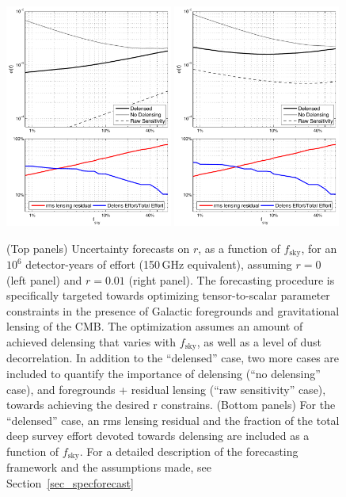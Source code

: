 \begin{figure}[!h]
\centering
\includegraphics[width=0.49\textwidth]{Inflation/sigr_fsky_det1e6_r0.pdf}
\includegraphics[width=0.49\textwidth]{Inflation/sigr_fsky_det1e6_r01.pdf}
\caption{(Top panels)
Uncertainty forecasts on $r$, as a function of $f_\mathrm{sky}$, for an
$10^6$ detector-years of effort (150\,GHz equivalent), assuming $r=0$ (left panel) 
and $r=0.01$ (right panel). The forecasting procedure is specifically targeted 
towards optimizing tensor-to-scalar parameter constraints in the presence of 
Galactic foregrounds and gravitational lensing of the CMB. The optimization 
assumes an amount of achieved delensing that varies with $f_\mathrm{sky}$, as well as a
level of dust decorrelation. In addition to the ``delensed'' case, two more cases are
 included to quantify the importance of delensing (``no delensing'' case), and 
foregrounds + residual lensing (``raw sensitivity'' case), towards achieving the 
desired r constrains.
(Bottom panels)
For the ``delensed'' case, an rms lensing residual and the fraction of the total 
deep survey effort devoted towards delensing are included as a function of 
$f_\mathrm{sky}$. For a detailed description of the forecasting framework and the 
assumptions made, see Section~\ref{sec_specforecast}}
\label{fig_rforecast1}
\end{figure}

